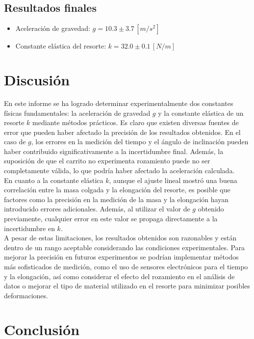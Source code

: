 \documentclass{article}
\begin{document}
\begin{multicols}{2}
\subsection*{Resultados finales}

    \begin{itemize}
        \item Aceleración de gravedad: $g = 10.3 \pm 3.7 \, [m/s^2]$
        \item Constante elástica del resorte: $k = 32.0 \pm 0.1 \, [N/m]$
    \end{itemize}

\section*{Discusión}

    En este informe se ha logrado determinar experimentalmente dos constantes físicas fundamentales:
    la aceleración de gravedad $g$ y la constante elástica de un resorte $k$ mediante métodos prácticos.
    Es claro que existen diversas fuentes de error que pueden haber afectado la precisión de los resultados
    obtenidos. En el caso de $g$, los errores en la medición del tiempo y el ángulo de inclinación pueden
    haber contribuido significativamente a la incertidumbre final. Además, la suposición de que el carrito
    no experimenta rozamiento puede no ser completamente válida, lo que podría haber afectado la 
    aceleración calculada.\\
    En cuanto a la constante elástica $k$, aunque el ajuste lineal mostró una buena correlación entre
    la masa colgada y la elongación del resorte, es posible que factores como la precisión en la medición
    de la masa y la elongación hayan introducido errores adicionales. Además, al utilizar el valor de $g$
    obtenido previamente, cualquier error en este valor se propaga directamente a la incertidumbre en $k$.
    \\ A pesar de estas limitaciones, los resultados obtenidos son razonables y están dentro de un rango
    aceptable considerando las condiciones experimentales. Para mejorar la precisión en futuros 
    experimentos se podrían implementar métodos más sofisticados de medición, como el uso de sensores
    electrónicos para el tiempo y la elongación, así como considerar el efecto del rozamiento en el 
    análisis de datos o mejorar el tipo de material utilizado en el resorte para minimizar posibles 
    deformaciones.

\section*{Conclusión}


\end{multicols}
\end{document}

